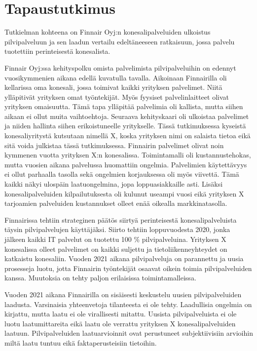 \chapter{Tapaustutkimus\label{tapautustutkimus}}
Tutkielman kohteena on Finnair Oyj:n konesalipalveluiden ulkoistus pilvipalveluun ja sen laadun vertailu edeltäneeseen ratkaisuun, jossa palvelu tuotettiin perinteisestä konesalista.

Finnair Oyj:ssa kehityspolku omista palvelimista pilvipalveluihin on edennyt vuosikymmenien aikana edellä kuvatulla tavalla. Aikoinaan Finnairilla oli kellarissa oma konesali, jossa toimivat kaikki yrityksen palvelimet. Niitä ylläpitivät yrityksen omat työntekijät. Myös fyysiset palvelinlaitteet olivat yrityksen omaisuutta. Tämä tapa ylläpitää palvelimia oli kallista, mutta siihen aikaan ei ollut muita vaihtoehtoja. Seuraava kehityskaari oli ulkoistaa palvelimet ja niiden hallinta siihen erikoistuneelle yritykselle. Tässä tutkimuksessa kyseistä konesaliyritystä kutsutaan nimellä X, koska yrityksen nimi on salaista tietoa eikä sitä voida julkistaa tässä tutkimuksessa. Finnairin palvelimet olivat noin kymmenen vuotta yrityksen X:n konesalissa. Toimintamalli oli kustannustehokas, mutta vuosien aikana palvelussa huomattiin ongelmia. Palvelimien käytettävyys ei ollut parhaalla tasolla sekä ongelmien korjauksessa oli myös viivettä. Tämä kaikki näkyi ulospäin laatuongelmina, jopa loppuasiakkaille asti. Lisäksi konesalipalveluiden kilpailutuksesta oli kulunut useampi vuosi eikä yrityksen X tarjoamien palveluiden kustannukset olleet enää oikealla markkinatasolla.

Finnairissa tehtiin strateginen päätös siirtyä perinteisestä konesalipalveluista täysin pilvipalvelujen käyttäjäksi. Siirto tehtiin loppuvuodesta 2020, jonka jälkeen kaikki IT palvelut on tuotettu 100 \% pilvipalveluina. Yrityksen X konesalissa olleet palvelimet on kaikki suljettu ja tietoliikenneyhteydet on katkaistu konesaliin. Vuoden 2021 aikana pilvipalveluja on parannettu ja uusia prosesseja luotu, jotta Finnairin työntekijät osaavat oikein toimia pilvipalveluiden kanssa. Muutoksia on tehty paljon erilaisissa toimintamalleissa.

Vuoden 2021 aikana Finnairilla on sisäisesti keskustelu uusien pilvipalveluiden laadusta. Varsinaisia yhteenvetoja tilanteesta ei ole tehty. Laadullisia ongelmia on kirjattu, mutta laatu ei ole virallisesti mitattu. Uusista pilvipalveluista ei ole luotu laatumittareita eikä laatu ole verrattu yrityksen X konesalipalveluiden laatuun. Pilvipalveluiden laatuarvioinnit ovat perustuneet subjektiivisiin arvioihin miltä laatu tuntuu eikä faktaperusteisiin tietoihin. 
